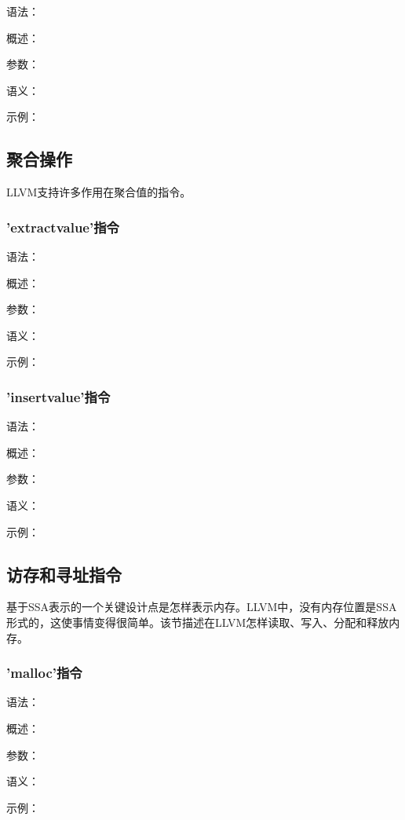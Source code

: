 \documentclass[12pt,a4paper]{article}
\begin{document}
{语法：

概述：

参数：

语义：

示例：


\subsection{聚合操作}

LLVM支持许多作用在聚合值的指令。

\subsubsection{'extractvalue'指令} %

语法：

概述：

参数：

语义：

示例：


\subsubsection{'insertvalue'指令} %

语法：

概述：

参数：

语义：

示例：


\subsection{访存和寻址指令}

基于SSA表示的一个关键设计点是怎样表示内存。LLVM中，没有内存位置是SSA形式的，这使事情变得很简单。该节描述在LLVM怎样读取、写入、分配和释放内存。

\subsubsection{'malloc'指令} %

语法：

概述：

参数：

语义：

示例：

}
\end{document}
